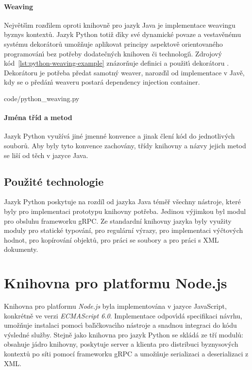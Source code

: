 \paragraph{Weaving} Největš\'{\i}m rozd\'{\i}lem oproti knihovně pro
jazyk Java je implementace weavingu byznys kontextů.
Jazyk Python totiž d\'{\i}ky své dynamické povaze a vestavěnému
systému dekorátorů umožňuje aplikovat principy aspektově orientovaného
programován\'{\i} bez potřeby dodatečn\'ych knihoven či technologi\'{\i}.
Zdrojov\'y kód~\ref{lst:python-weaving-example} znázorňuje
definici a použit\'{\i} dekorátoru .
Dekorátoru je potřeba předat samotn\'y weaver, narozd\'{\i}l
od implementace v Javě, kdy se o předán\'{\i} weaveru postará dependency
injection container.


{code/python_weaving.py}

\paragraph{Jména tříd a metod} Jazyk Python využívá jiné jmenné konvence
a jinak člení kód do jednotlivých souborů. Aby byly tyto konvence zachovány,
třídy knihovny a názvy jejich metod se liší od těch v jazyce Java.

\subsection{Použité technologie}

Jazyk Python poskytuje na rozdíl od jazyka Java téměř všechny nástroje, které byly pro implementaci
prototypu knihovny potřeba. Jedinou výjimkou byl modul pro obsluhu frameworku gRPC.
Ze standardní knihovny jazyka byly využity moduly  pro statické typování,
 pro regulární výrazy,  pro implementaci výčtových hodnot,  pro
kopírování objektů,  pro práci se soubory a  pro práci s XML dokumenty.


\section{Knihovna pro platformu Node.js}

Knihovna pro platformu \textit{Node.js} byla implementována
v jazyce JavaScript, konkrétně ve verzi \textit{ECMAScript 6.0}.
Implementace odpov\'{\i}dá specifikaci návrhu, umožňuje
instalaci pomoc\'{\i} bal\'{\i}čkovac\'{\i}ho nástroje a snadnou
integraci do kódu v\'ysledné služby. Stejně jako knihovna
pro jazyk Python se skládá ze tří modulů:  obsahuje
jádro knihovny,  poskytuje server a klienta pro distribuci
byznysových kontextů po síti pomocí frameworku gRPC a  umožňuje
serializaci a deserializaci z XML.


